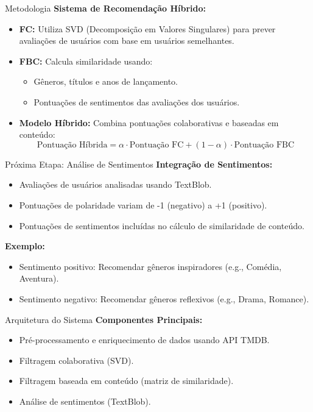 \documentclass{beamer}
\begin{document}
\begin{frame}{Metodologia}
    \textbf{Sistema de Recomendação Híbrido:}
    \begin{itemize}
        \item \textbf{FC:} Utiliza SVD (Decomposição em Valores Singulares) para prever avaliações de usuários com base em usuários semelhantes.
        \item \textbf{FBC:} Calcula similaridade usando:
        \begin{itemize}
            \item Gêneros, títulos e anos de lançamento.
            \item Pontuações de sentimentos das avaliações dos usuários.
        \end{itemize}
        \item \textbf{Modelo Híbrido:} Combina pontuações colaborativas e baseadas em conteúdo:
        \[
        \text{Pontuação Híbrida} = \alpha \cdot \text{Pontuação FC} + (1 - \alpha) \cdot \text{Pontuação FBC}
        \]
    \end{itemize}
\end{frame}

\begin{frame}{Próxima Etapa: Análise de Sentimentos}
    \textbf{Integração de Sentimentos:}
    \begin{itemize}
        \item Avaliações de usuários analisadas usando TextBlob.
        \item Pontuações de polaridade variam de -1 (negativo) a +1 (positivo).
        \item Pontuações de sentimentos incluídas no cálculo de similaridade de conteúdo.
    \end{itemize}
    \vspace{0.5cm}
    \textbf{Exemplo:}
    \begin{itemize}
        \item Sentimento positivo: Recomendar gêneros inspiradores (e.g., Comédia, Aventura).
        \item Sentimento negativo: Recomendar gêneros reflexivos (e.g., Drama, Romance).
    \end{itemize}
\end{frame}

\begin{frame}{Arquitetura do Sistema}
    \textbf{Componentes Principais:}
    \begin{itemize}
        \item Pré-processamento e enriquecimento de dados usando API TMDB.
        \item Filtragem colaborativa (SVD).
        \item Filtragem baseada em conteúdo (matriz de similaridade).
        \item Análise de sentimentos (TextBlob).
    \end{itemize}
\end{frame}
\end{document}
